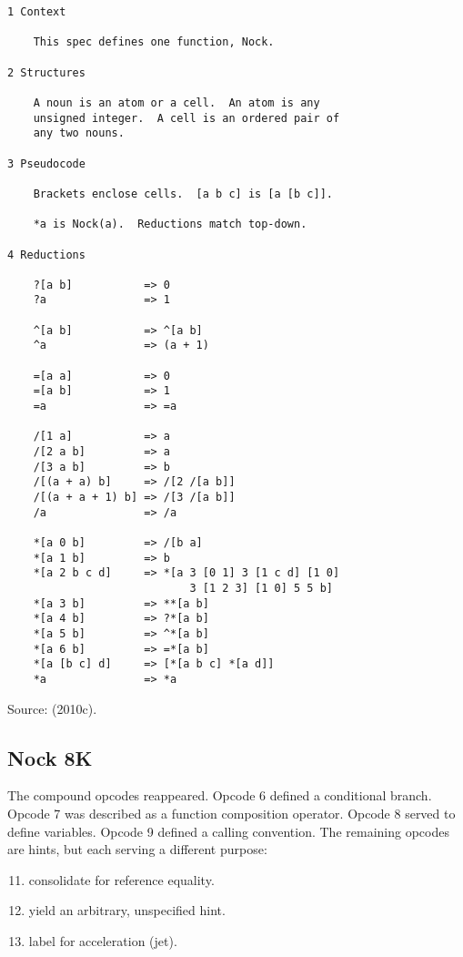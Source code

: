 \documentclass[twoside]{article}
\begin{document}
\begin{lstlisting}[label=lst:nock9k,caption={Nock 9K, \textit{terminus ad quem} 7 January 2010.},style=listingcode]
1 Context

    This spec defines one function, Nock.

2 Structures

    A noun is an atom or a cell.  An atom is any
    unsigned integer.  A cell is an ordered pair of
    any two nouns.

3 Pseudocode

    Brackets enclose cells.  [a b c] is [a [b c]].

    *a is Nock(a).  Reductions match top-down.

4 Reductions

    ?[a b]           => 0
    ?a               => 1

    ^[a b]           => ^[a b]
    ^a               => (a + 1)

    =[a a]           => 0
    =[a b]           => 1
    =a               => =a

    /[1 a]           => a
    /[2 a b]         => a
    /[3 a b]         => b
    /[(a + a) b]     => /[2 /[a b]]
    /[(a + a + 1) b] => /[3 /[a b]]
    /a               => /a

    *[a 0 b]         => /[b a]
    *[a 1 b]         => b
    *[a 2 b c d]     => *[a 3 [0 1] 3 [1 c d] [1 0]
                            3 [1 2 3] [1 0] 5 5 b]
    *[a 3 b]         => **[a b]
    *[a 4 b]         => ?*[a b]
    *[a 5 b]         => ^*[a b]
    *[a 6 b]         => =*[a b]
    *[a [b c] d]     => [*[a b c] *[a d]]
    *a               => *a
\end{lstlisting}

Source:   (2010c). %

\subsection{Nock 8K}

The compound opcodes reappeared.  Opcode 6 defined a conditional branch.  Opcode 7 was described as a function composition operator.  Opcode 8 served to define variables.  Opcode 9 defined a calling convention.  The remaining opcodes are hints, but each serving a different purpose:

\begin{enumerate}
  \setcounter{enumi}{10}
  \item  consolidate for reference equality.
  \item  yield an arbitrary, unspecified hint.
  \item  label for acceleration (jet).
\end{enumerate}
\end{document}
